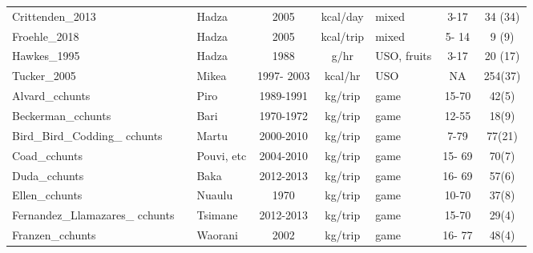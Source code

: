 \begin{landscape}
\begin{longtable}{M{2.6cm} M{3.6cm} M{1.5cm} c c M{1cm} c c}
Crittenden\_2013               & \cite{crittenden_juvenile_2013}           & Hadza           & 2005       & kcal/day & mixed              & 3-17    & 34 (34)     \\
Froehle\_2018                  & \cite{froehle_physical_2019}              & Hadza           & 2005       & kcal/trip & mixed              & 5- 14   & 9 (9)       \\
Hawkes\_1995                   & \cite{hawkes_hadza_1995}                  & Hadza           & 1988       & g/hr      & USO, fruits        & 3-17    & 20 (17)     \\
Tucker\_2005                   & \cite{tucker_growing_2005}                & Mikea           & 1997- 2003 & kcal/hr   & USO                & NA      & 254(37)     \\
Alvard\_cchunts                & \cite{alvard_shotguns_1995}               & Piro            & 1989-1991  & kg/trip   & game               & 15-70   & 42(5)     \\
Beckerman\_cchunts             & \cite{beckerman_ecology_2013}             & Bari            & 1970-1972  & kg/trip   & game               & 12-55   & 18(9)    \\
Bird\_Bird\_Codding\_ cchunts     & \cite{bird_pursuit_2009}                  & Martu           & 2000-2010  & kg/trip   & game               & 7-79    & 77(21)     \\
Coad\_cchunts                  & \cite{coad_bushmeat_2008}                 & Pouvi, etc    & 2004-2010  & kg/trip   & game               & 15- 69  & 70(7)     \\
Duda\_cchunts                  & \cite{reyes-garcia_adaptive_2016}         & Baka            & 2012-2013  & kg/trip   & game               & 16- 69  & 57(6)      \\
Ellen\_cchunts                 & \cite{ellen_individual_1996}              & Nuaulu          & 1970       & kg/trip   & game               & 10-70   & 37(8)     \\
Fernandez\_Llamazares\_ cchunts  & \cite{reyes-garcia_adaptive_2016}         & Tsimane         & 2012-2013  & kg/trip   & game               & 15-70   & 29(4)     \\
Franzen\_cchunts               & \cite{franzen_evaluating_2006}            & Waorani         & 2002       & kg/trip   & game               & 16- 77  & 48(4)      \\

\end{longtable}
\end{landscape}
